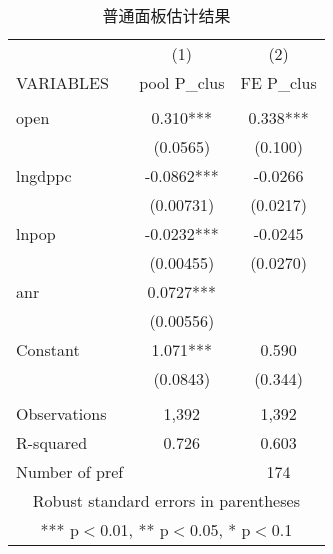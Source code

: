 \documentclass[10pt]{article}
\begin{document}
    \begin{table}
        \begin{center}
            \caption{普通面板估计结果} \label{tb:panel}
            \begin{tabular}{lcc} \hline \hline
                 & (1) & (2) \\
                VARIABLES & pool P\_clus & FE P\_clus \\ \hline
                 &  &  \\
                open & 0.310*** & 0.338*** \\
                 & (0.0565) & (0.100) \\
                lngdppc & -0.0862*** & -0.0266 \\
                 & (0.00731) & (0.0217) \\
                lnpop & -0.0232*** & -0.0245 \\
                 & (0.00455) & (0.0270) \\
                anr & 0.0727*** &  \\
                 & (0.00556) &  \\
                Constant & 1.071*** & 0.590 \\
                 & (0.0843) & (0.344) \\
                 &  &  \\
                Observations & 1,392 & 1,392 \\
                R-squared & 0.726 & 0.603 \\
                 Number of pref &  & 174 \\ \hline \hline
                \multicolumn{3}{c}{ Robust standard errors in parentheses} \\
                \multicolumn{3}{c}{ *** p$<$0.01, ** p$<$0.05, * p$<$0.1} \\
            \end{tabular}
        \end{center}
    \end{table}
\end{document}
